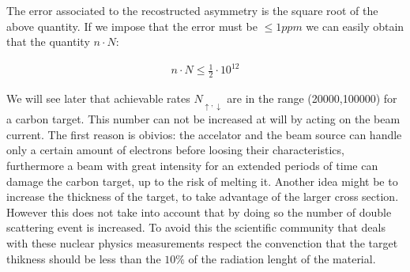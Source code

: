 The error associated to the recostructed asymmetry is the square root of the above quantity. If we impose that the error must be $\le 1ppm$ we can easily obtain that the quantity $n\cdot N$:

\begin{align*}
n\cdot N \le \frac{1}{2} \cdot 10^{12}
\end{align*} 

We will see later that achievable rates $N_{\uparrow,\downarrow}$ are in the range (20000,100000) for a carbon target. This number can not be increased at will by acting on the beam current. The first reason is obivios: the accelator and the beam source can handle only a certain amount of electrons before loosing their characteristics, furthermore a beam with great intensity for an extended periods of time can damage the carbon target, up to the risk of melting it. 
Another idea might be to increase the thickness of the target, to take advantage of the larger cross section. However this does not take into account that by doing so the number of double scattering event is increased. To avoid this the scientific community that deals with these nuclear physics measurements respect the convenction that the target thikness should be less than the $10 \%$ of the radiation lenght of the material.
